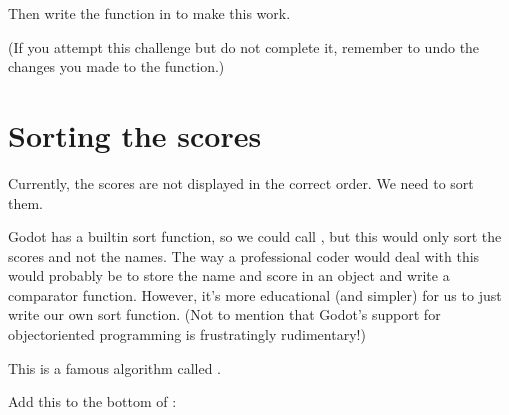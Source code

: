 \documentclass[letterpaper,10pt,english]{sphinxmanual}
\begin{document}
\sphinxAtStartPar
Then write the  function in  to make this
work.

\sphinxAtStartPar
(If you attempt this challenge but do not complete it, remember to undo
the changes you made to the  function.)


\section{Sorting the scores}
\label{\detokenize{tutorial:sorting-the-scores}}
\sphinxAtStartPar
Currently, the scores are not displayed in the correct order. We need to
sort them.

\sphinxAtStartPar
Godot has a built\sphinxhyphen{}in sort function, so we could call ,
but this would only sort the scores and not the names. The way a
professional coder would deal with this would probably be to store the
name and score in an object and write a comparator function. However,
it’s more educational (and simpler) for us to just write our own sort
function. (Not to mention that Godot’s support for object\sphinxhyphen{}oriented
programming is frustratingly rudimentary!)

\sphinxAtStartPar
This is a famous algorithm called .

\sphinxAtStartPar
Add this to the bottom of :

\begin{sphinxVerbatim}[commandchars=\\\{\}]
 
       
           
             \PYG{p}{[}\PYG{p}{]}\PYG{p}{[}\PYG{p}{]}
                   \PYG{p}{[}\PYG{p}{]}
                \PYG{p}{[}\PYG{p}{]}  \PYG{p}{[}\PYG{p}{]}
                \PYG{p}{[}\PYG{p}{]}  
                  \PYG{p}{[}\PYG{p}{]}
                \PYG{p}{[}\PYG{p}{]}  \PYG{p}{[}\PYG{p}{]}
                \PYG{p}{[}\PYG{p}{]}  
\end{sphinxVerbatim}
\end{document}
